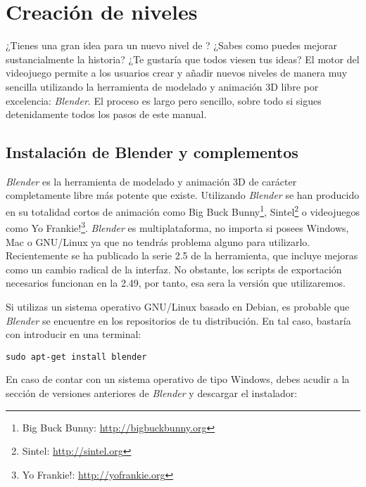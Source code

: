 

\section*{Creación de niveles}

¿Tienes una gran idea para un nuevo nivel de \juego? ¿Sabes como puedes
mejorar sustancialmente la historia? ¿Te gustaría que todos viesen tus ideas?
El motor del videojuego permite a los usuarios crear y añadir nuevos niveles
de manera muy sencilla utilizando la herramienta de modelado y animación
3D libre por excelencia: \textit{Blender}. El proceso es largo pero sencillo,
sobre todo si sigues detenidamente todos los pasos de este manual.

\subsection*{Instalación de Blender y complementos}

\textit{Blender} es la herramienta de modelado y animación 3D de carácter
completamente libre más potente que existe. Utilizando \textit{Blender}
se han producido en su totalidad cortos de animación como
Big Buck Bunny\footnote{Big Buck Bunny: \url{http://bigbuckbunny.org}},
Sintel\footnote{Sintel: \url{http://sintel.org}} o videojuegos como
Yo Frankie!\footnote{Yo Frankie!: \url{http://yofrankie.org}}. \textit{Blender} es
multiplataforma, no importa si posees Windows, Mac o GNU/Linux ya que no
tendrás problema alguno para utilizarlo. Recientemente se ha publicado la
serie 2.5 de la herramienta, que incluye mejoras como un cambio radical de
la interfaz. No obstante, los scripts de exportación necesarios funcionan
en la 2.49, por tanto, esa sera la versión que utilizaremos.\\


Si utilizas un sistema operativo GNU/Linux basado en Debian, es probable
que \textit{Blender} se encuentre en los repositorios de tu distribución.
En tal caso, bastaría con introducir en una terminal:

\begin{lstlisting}[style=consola]
sudo apt-get install blender
\end{lstlisting}

En caso de contar con un sistema operativo de tipo Windows, debes acudir
a la sección de versiones anteriores de \textit{Blender} y descargar el
instalador:\\

